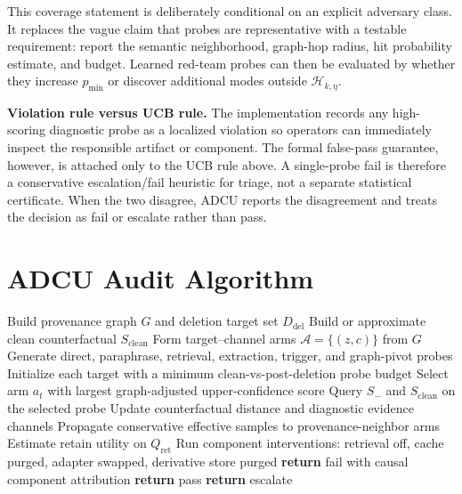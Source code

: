 \documentclass[10pt,journal,compsoc]{IEEEtran}
\newcommand{\method}{ADCU}
\begin{document}
This coverage statement is deliberately conditional on an explicit adversary class. It replaces the vague claim that probes are representative with a testable requirement: report the semantic neighborhood, graph-hop radius, hit probability estimate, and budget. Learned red-team probes can then be evaluated by whether they increase $p_{\min}$ or discover additional modes outside $\mathcal{H}_{k,\eta}$.

\textbf{Violation rule versus UCB rule.}
The implementation records any high-scoring diagnostic probe as a localized violation so operators can immediately inspect the responsible artifact or component. The formal false-pass guarantee, however, is attached only to the UCB rule above. A single-probe fail is therefore a conservative escalation/fail heuristic for triage, not a separate statistical certificate. When the two disagree, \method{} reports the disagreement and treats the decision as fail or escalate rather than pass.


\section{\method{} Audit Algorithm}

\begin{algorithm}[t]
\caption{\method{} graph-adaptive counterfactual audit}
\begin{algorithmic}[1]
\STATE Build provenance graph $G$ and deletion target set $D_{\mathrm{del}}$
\STATE Build or approximate clean counterfactual $S_{\mathrm{clean}}$
\STATE Form target--channel arms $\mathcal{A}=\{(z,c)\}$ from $G$
\STATE Generate direct, paraphrase, retrieval, extraction, trigger, and graph-pivot probes
\STATE Initialize each target with a minimum clean-vs-post-deletion probe budget
 \STATE Select arm $a_t$ with largest graph-adjusted upper-confidence score
 \STATE Query $S_-$ and $S_{\mathrm{clean}}$ on the selected probe
 \STATE Update counterfactual distance and diagnostic evidence channels
 \STATE Propagate conservative effective samples to provenance-neighbor arms
\ENDWHILE
\STATE Estimate retain utility on $Q_{\mathrm{ret}}$
\STATE Run component interventions: retrieval off, cache purged, adapter swapped, derivative store purged
 \STATE \textbf{return} fail with causal component attribution
 \STATE \textbf{return} pass
\ELSE
 \STATE \textbf{return} escalate
\ENDIF
\end{algorithmic}
\end{algorithm}
\end{document}
